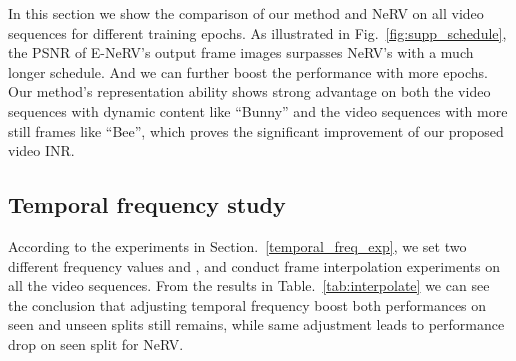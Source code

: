 \documentclass[runningheads]{llncs}
\begin{document}
In this section we show the comparison of our method and NeRV on all video sequences for different training epochs. As illustrated in Fig.~\ref{fig:supp_schedule}, the PSNR of E-NeRV's output frame images surpasses NeRV's with a much longer  schedule. And we can further boost the performance with more epochs. Our method's representation ability shows strong advantage on both the video sequences with dynamic content like ``Bunny'' and the video sequences with more still frames like ``Bee'', which proves the significant improvement of our proposed video INR.

\subsection{Temporal frequency study}

According to the experiments in Section.~\ref{temporal_freq_exp}, we set two different frequency values  and , and conduct frame interpolation experiments on all the video sequences. From the results in Table.~\ref{tab:interpolate} we can see the conclusion that adjusting temporal frequency boost both performances on seen and unseen splits still remains, while same adjustment leads to performance drop on seen split for NeRV.
\end{document}
